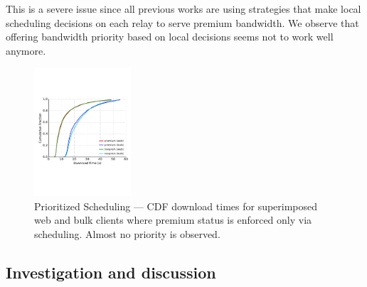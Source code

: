 This is a severe issue since all previous works are using strategies that make
local scheduling decisions on each relay to serve premium bandwidth. We observe
that offering bandwidth priority based on local decisions seems not to work well
anymore.

\begin{figure} \centering
  \includegraphics[trim={0 3cm 0 3cm}, clip,
    width=0.32\textwidth]{images/scheduling_priority.pdf}
  \caption[Prioritized Scheduling]{Prioritized Scheduling --- CDF download times
    for superimposed web and bulk clients where premium status is enforced only
    via scheduling. Almost no priority is observed.}
  \label{fig:scheduling_priority}
\end{figure}

\subsection{Investigation and discussion}

